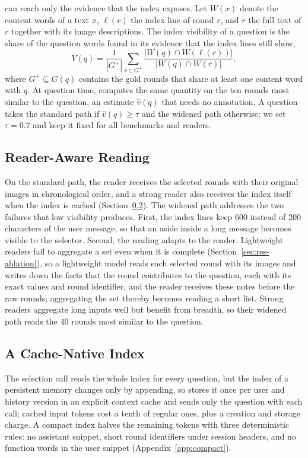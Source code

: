 \qss{} can reach only the evidence that the index exposes. Let $W(x)$ denote the content words of a text $x$, $\ell(r)$ the index line of round $r$, and $\bar r$ the full text of $r$ together with its image descriptions. The index visibility of a question is the share of the question words found in its evidence that the index lines still show,
\begin{equation}
V(q)=\frac{1}{|G^{+}|}\sum_{r\in G^{+}}\frac{|W(q)\cap W(\ell(r))|}{|W(q)\cap W(\bar r)|},
\label{eq:vis}
\end{equation}
where $G^{+}\subseteq G(q)$ contains the gold rounds that share at least one content word with $q$. At question time, \vgs{} computes the same quantity on the ten rounds most similar to the question, an estimate $\hat v(q)$ that needs no annotation. A question takes the standard path if $\hat v(q)\ge\tau$ and the widened path otherwise; we set $\tau{=}0.7$ and keep it fixed for all benchmarks and readers.

\subsection{Reader-Aware Reading}
\label{sec:read}

On the standard path, the reader receives the selected rounds with their original images in chronological order, and a strong reader also receives the index itself when the index is cached (Section~\ref{sec:cache}). The widened path addresses the two failures that low visibility produces. First, the index lines keep 600 instead of 200 characters of the user message, so that an aside inside a long message becomes visible to the selector. Second, the reading adapts to the reader. Lightweight readers fail to aggregate a set even when it is complete (Section~\ref{sec:res-ablation}), so a lightweight model reads each selected round with its images and writes down the facts that the round contributes to the question, each with its exact values and round identifier, and the reader receives these notes before the raw rounds; aggregating the set thereby becomes reading a short list. Strong readers aggregate long inputs well but benefit from breadth, so their widened path reads the 40 rounds most similar to the question.

\subsection{A Cache-Native Index}
\label{sec:cache}

The selection call reads the whole index for every question, but the index of a persistent memory changes only by appending, so \vgs{} stores it once per user and history version in an explicit context cache and sends only the question with each call; cached input tokens cost a tenth of regular ones, plus a creation and storage charge. A compact index halves the remaining tokens with three deterministic rules: no assistant snippet, short round identifiers under session headers, and no function words in the user snippet (Appendix~\ref{app:compact}).
